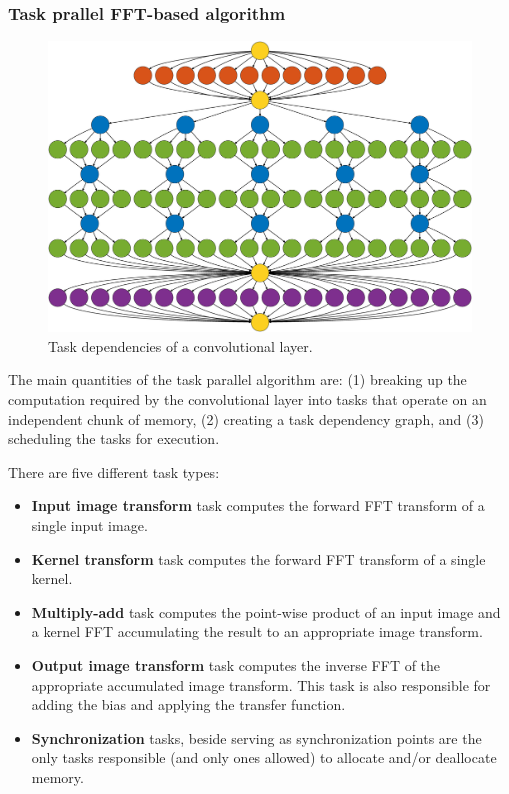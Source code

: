 \documentclass[conference]{IEEEtran}
\begin{document}
\subsubsection{Task prallel FFT-based algorithm}

  \begin{figure}
    \begin{center}
      \includegraphics[width=0.95\columnwidth]{fig/deps}
    \end{center}
    \caption{Task dependencies of a convolutional layer.}
    \label{fig:task_deps}
  \end{figure}

  The main quantities of the task parallel algorithm are: (1) breaking
  up the computation required by the convolutional layer into tasks
  that operate on an independent chunk of memory, (2) creating a task
  dependency graph, and (3) scheduling the tasks for execution.

  There are five different task types:

  \begin{itemize}
    \item {\color{zred}\bf Input image transform} task computes the
      forward FFT transform of a single input image.
    \item {\color{zblue}\bf Kernel transform} task computes the forward
      FFT transform of a single kernel.
    \item {\color{zgreen}\bf Multiply-add} task computes the
      point-wise product of an input image and a kernel FFT
      accumulating the result to an appropriate image transform.
    \item {\color{zpurple}\bf Output image transform} task computes
      the inverse FFT of the appropriate accumulated image transform.
      This task is also responsible for adding the bias and applying
      the transfer function.
    \item {\color{zyellow}\bf Synchronization} tasks, beside serving
      as synchronization points are the only tasks responsible (and
      only ones allowed) to allocate and/or deallocate memory.
  \end{itemize}
\end{document}
